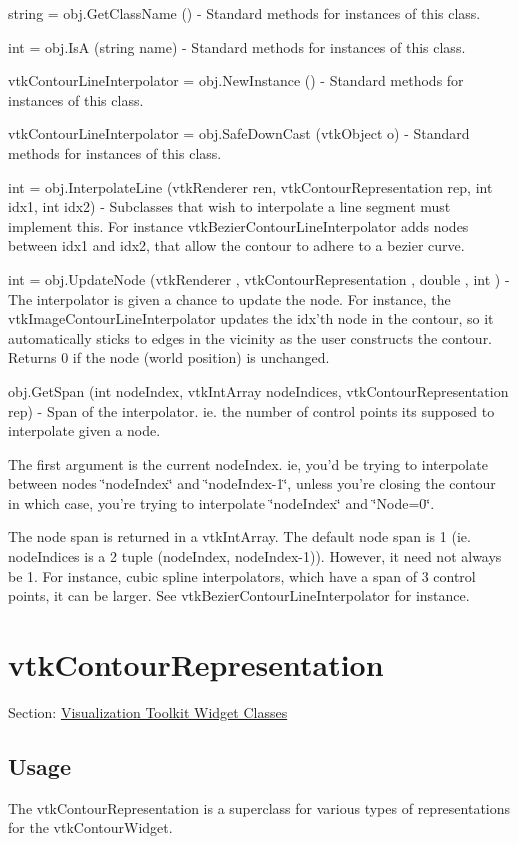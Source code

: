 \begin{DoxyItemize}
\item {\ttfamily string = obj.\-Get\-Class\-Name ()} -\/ Standard methods for instances of this class.  
\item {\ttfamily int = obj.\-Is\-A (string name)} -\/ Standard methods for instances of this class.  
\item {\ttfamily vtk\-Contour\-Line\-Interpolator = obj.\-New\-Instance ()} -\/ Standard methods for instances of this class.  
\item {\ttfamily vtk\-Contour\-Line\-Interpolator = obj.\-Safe\-Down\-Cast (vtk\-Object o)} -\/ Standard methods for instances of this class.  
\item {\ttfamily int = obj.\-Interpolate\-Line (vtk\-Renderer ren, vtk\-Contour\-Representation rep, int idx1, int idx2)} -\/ Subclasses that wish to interpolate a line segment must implement this. For instance vtk\-Bezier\-Contour\-Line\-Interpolator adds nodes between idx1 and idx2, that allow the contour to adhere to a bezier curve.  
\item {\ttfamily int = obj.\-Update\-Node (vtk\-Renderer , vtk\-Contour\-Representation , double , int )} -\/ The interpolator is given a chance to update the node. For instance, the vtk\-Image\-Contour\-Line\-Interpolator updates the idx'th node in the contour, so it automatically sticks to edges in the vicinity as the user constructs the contour. Returns 0 if the node (world position) is unchanged.  
\item {\ttfamily obj.\-Get\-Span (int node\-Index, vtk\-Int\-Array node\-Indices, vtk\-Contour\-Representation rep)} -\/ Span of the interpolator. ie. the number of control points its supposed to interpolate given a node.

The first argument is the current node\-Index. ie, you'd be trying to interpolate between nodes \char`\"{}node\-Index\char`\"{} and \char`\"{}node\-Index-\/1\char`\"{}, unless you're closing the contour in which case, you're trying to interpolate \char`\"{}node\-Index\char`\"{} and \char`\"{}\-Node=0\char`\"{}.

The node span is returned in a vtk\-Int\-Array. The default node span is 1 (ie. node\-Indices is a 2 tuple (node\-Index, node\-Index-\/1)). However, it need not always be 1. For instance, cubic spline interpolators, which have a span of 3 control points, it can be larger. See vtk\-Bezier\-Contour\-Line\-Interpolator for instance.  
\end{DoxyItemize}\hypertarget{vtkwidgets_vtkcontourrepresentation}{}\section{vtk\-Contour\-Representation}\label{vtkwidgets_vtkcontourrepresentation}
Section\-: \hyperlink{sec_vtkwidgets}{Visualization Toolkit Widget Classes} \hypertarget{vtkwidgets_vtkxyplotwidget_Usage}{}\subsection{Usage}\label{vtkwidgets_vtkxyplotwidget_Usage}
The vtk\-Contour\-Representation is a superclass for various types of representations for the vtk\-Contour\-Widget.

